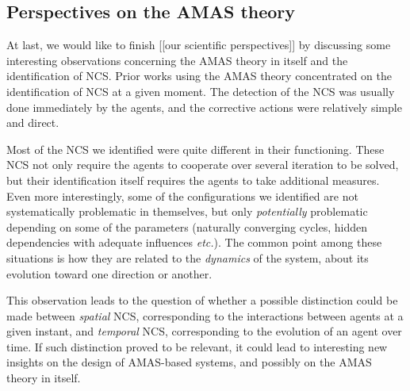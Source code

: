 \subsection*{Perspectives on the AMAS theory}

At last, we would like to finish [[our scientific perspectives]] by discussing some interesting observations concerning the AMAS theory in itself and the identification of NCS. Prior works using the AMAS theory concentrated on the identification of NCS at a given moment. The detection of the NCS was usually done immediately by the agents, and the corrective actions were relatively simple and direct.

Most of the NCS we identified were quite different in their functioning. These NCS not only require the agents to cooperate over several iteration to be solved, but their identification itself requires the agents to take additional measures. Even more interestingly, some of the configurations we identified are not systematically problematic in themselves, but only \emph{potentially} problematic depending on some of the parameters (naturally converging cycles, hidden dependencies with adequate influences \emph{etc.}). The common point among these situations is how they are related to the \emph{dynamics} of the system, about its evolution toward one direction or another.

This observation leads to the question of whether a possible distinction could be made between \emph{spatial} NCS, corresponding to the interactions between agents at a given instant, and \emph{temporal} NCS, corresponding to the evolution of an agent over time. If such distinction proved to be relevant, it could lead to interesting new insights on the design of AMAS-based systems, and possibly on the AMAS theory in itself.


